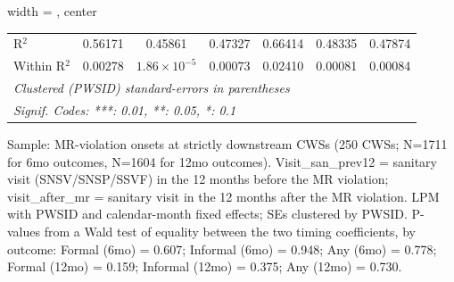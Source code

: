 \begin{table}[htbp]
\begin{adjustbox}{width = \textwidth, center}
\begin{tabular}{lcccccc}
   R$^2$                                 & 0.56171              & 0.45861                & 0.47327           & 0.66414               & 0.48335                 & 0.47874\\  
   Within R$^2$                          & 0.00278              & $1.86\times 10^{-5}$   & 0.00073           & 0.02410               & 0.00081                 & 0.00084\\  
   \midrule \midrule
   \multicolumn{7}{l}{\emph{Clustered (PWSID) standard-errors in parentheses}}\\
   \multicolumn{7}{l}{\emph{Signif. Codes: ***: 0.01, **: 0.05, *: 0.1}}\\
\end{tabular}
\par\endgroup
\end{adjustbox}
{\tiny\linespread{1}\selectfont \par \raggedright 
Sample: MR-violation onsets at strictly downstream CWSs (250 CWSs; N=1711 for 6mo outcomes, N=1604 for 12mo outcomes). Visit\_san\_prev12 = sanitary visit (SNSV/SNSP/SSVF) in the 12 months before the MR violation; visit\_after\_mr = sanitary visit in the 12 months after the MR violation. LPM with PWSID and calendar-month fixed effects; SEs clustered by PWSID. P-values from a Wald test of equality between the two timing coefficients, by outcome: Formal (6mo) = 0.607; Informal (6mo) = 0.948; Any (6mo) = 0.778; Formal (12mo) = 0.159; Informal (12mo) = 0.375; Any (12mo) = 0.730.
}
\end{table}
